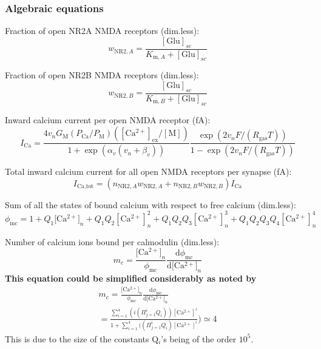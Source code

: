\documentclass[fleqn]{report}
\numberwithin{equation}{section}
\numberwithin{equation}{section}
\newcommand{\Glu}{\text{Glu}}
\newcommand{\Ca}{\text{Ca$^{2+}$}}
\newcommand{\Can}{\text{[Ca$^{2+}]_n$}}
\begin{document}
				\subsubsection*{Algebraic equations}
					Fraction of open NR2A NMDA receptors (dim.less): %
					\begin{equation} 
						w_{\text{NR2},A} = \frac{[\Glu]_{sc}}{K_{\text{m},A} + [\Glu]_{sc}}
					\end{equation}	
					
					Fraction of open NR2B NMDA receptors (dim.less): %
					\begin{equation} 
						w_{\text{NR2},B} = \frac{[\Glu]_{sc}}{K_{\text{m},B} + [\Glu]_{sc}}
					\end{equation}	
						
					Inward calcium current per open NMDA receptor (fA):	%
					\begin{equation} 
						I_{\text{Ca}} = \frac{4 v_n G_\text{M} (P_{\text{Ca}}/P_\text{M})([\Ca]_{\text{ex}}/[\text{M}])}{1+ \exp(\alpha_v(v_n+\beta_v))} \frac{\exp(2v_nF/(R_{\text{gas}}T))}{1-\exp(2v_nF/(R_{\text{gas}}T))}
					\end{equation}
					
					Total inward calcium current for all open NMDA receptors per synapse (fA): %
					\begin{equation} 
						I_{\text{Ca,tot}} = (n_{\text{NR2},A} w_{\text{NR2},A} + n_{\text{NR2},B}  w_{\text{NR2},B}) I_{\text{Ca}} 
					\end{equation}	
					
					Sum of all the states of bound calcium with respect to free calcium (dim.less): %
					\begin{equation} 
						\phi_{\text{mc}} = 1 + Q_1\Can + Q_1Q_2[\Ca]_n^2 + Q_1Q_2Q_3[\Ca]_n^3 +  Q_1Q_2Q_3Q_4[\Ca]_n^4 
					\end{equation}	
						
					Number of calcium ions bound per calmodulin (dim.less): 	%
					\begin{equation} 
						m_c = \frac{\Can}{\phi_{\text{mc}}} \frac{\mathrm{d}\phi_{\text{mc}}}{\mathrm{d}\Can}
					\end{equation}
					\textbf{This equation could be simplified considerably as noted by }
					\begin{eqnarray}
					m_c = \frac{\Can}{\phi_{\text{mc}}} \frac{\mathrm{d}\phi_{\text{mc}}}{\mathrm{d}\Can}\\
					=\frac{\sum_{i=1}^{4}(i(\Pi^{i}_{j=1}Q_{i})) [\Ca]^{i}}{1+\sum_{i=1}^{4}((\Pi^{i}_{j=1}Q_{i}) [\Ca]^{i}})	\simeq 4
					\end{eqnarray}
					This is due to the size of the constants Q$_{i}$'s being of the order $10^{5}$. 
					
\end{document}
